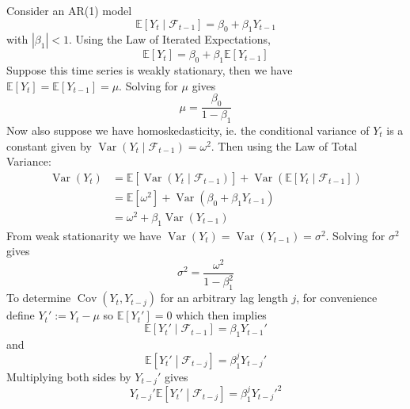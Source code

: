 \documentclass[11pt]{report} %
\begin{document}
Consider an AR(1) model
\begin{equation}
\mathbb{E}\left[Y_{t} \middle|\mathcal{F}_{t-1}\right] = \beta_{0} + \beta_{1}Y_{t - 1}
\end{equation}
with $\left|\beta_{1}\right| < 1$. Using the Law of Iterated Expectations,
\begin{equation}
\mathbb{E}\left[Y_{t}\right] = \beta_{0} + \beta_{1}\mathbb{E}\left[Y_{t - 1}\right]
\end{equation}
Suppose this time series is weakly stationary, then we have $\mathbb{E}\left[Y_{t}\right] = \mathbb{E}\left[Y_{t - 1}\right] = \mu$. Solving for $\mu$ gives
\begin{equation}
\mu = \dfrac{\beta_{0}}{1 - \beta_{1}}
\end{equation}
Now also suppose we have homoskedasticity, ie. the conditional variance of $Y_{t}$ is a constant given by $\operatorname{Var}\left(Y_{t}\middle|\mathcal{F}_{t-1}\right) = \omega^{2}$. Then using the Law of Total Variance:
\begin{align}
\operatorname{Var}\left(Y_{t}\right) &= \mathbb{E}\left[\operatorname{Var}\left(Y_{t}\middle|\mathcal{F}_{t-1}\right)\right] + \operatorname{Var}\left( \mathbb{E}\left[Y_{t}\middle|\mathcal{F}_{t-1}\right]\right) \\
&= \mathbb{E}\left[\omega^{2}\right] + \operatorname{Var}\left(\beta_{0} + \beta_{1}Y_{t - 1}\right) \\
&= \omega^{2} + \beta_{1}\operatorname{Var}\left(Y_{t - 1}\right)
\end{align}
From weak stationarity we have $\operatorname{Var}\left(Y_{t}\right) = \operatorname{Var}\left(Y_{t - 1}\right) = \sigma^{2}$. Solving for $\sigma^{2}$ gives
\begin{equation}
\sigma^{2} = \dfrac{\omega^{2}}{1 - \beta_{1}^{2}}
\end{equation}
To determine $\operatorname{Cov}\left(Y_{t}, Y_{t - j}\right)$ for an arbitrary lag length $j$, for convenience define $Y_{t}' := Y_{t} - \mu$ so $\mathbb{E}\left[Y_{t}'\right] = 0$ which then implies
\begin{equation}
\mathbb{E}\left[Y_{t}'\middle|\mathcal{F}_{t-1}\right] = \beta_{1}Y_{t - 1}'
\end{equation}
and
\begin{equation}
\mathbb{E}\left[Y_{t}'\middle|\mathcal{F}_{t-j}\right] = \beta_{1}^{j}Y_{t - j}'
\end{equation}
Multiplying both sides by $Y_{t - j}'$ gives
\begin{equation}
Y_{t - j}'\mathbb{E}\left[Y_{t}'\middle|\mathcal{F}_{t-j}\right] = \beta_{1}^{j}Y_{t - j}'^{2}
\end{equation}
\end{document}
